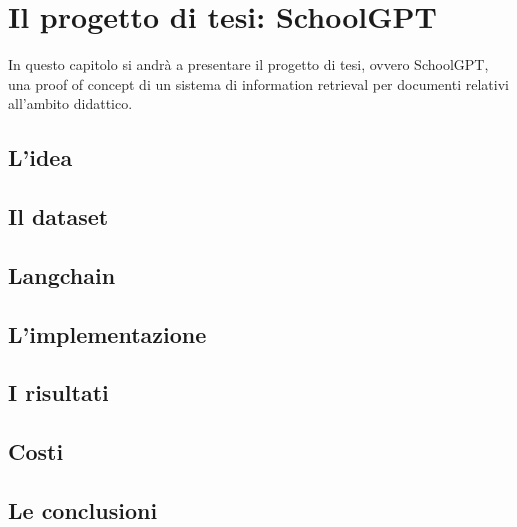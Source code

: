 \chapter{Il progetto di tesi: SchoolGPT}
In questo capitolo si andrà a presentare il progetto di tesi, ovvero SchoolGPT, una proof of concept di un sistema di information retrieval per documenti relativi all'ambito didattico.
\section{L'idea}

\section{Il dataset}

\section{Langchain}

\section{L'implementazione}

\section{I risultati}
\section{Costi}

\section{Le conclusioni}